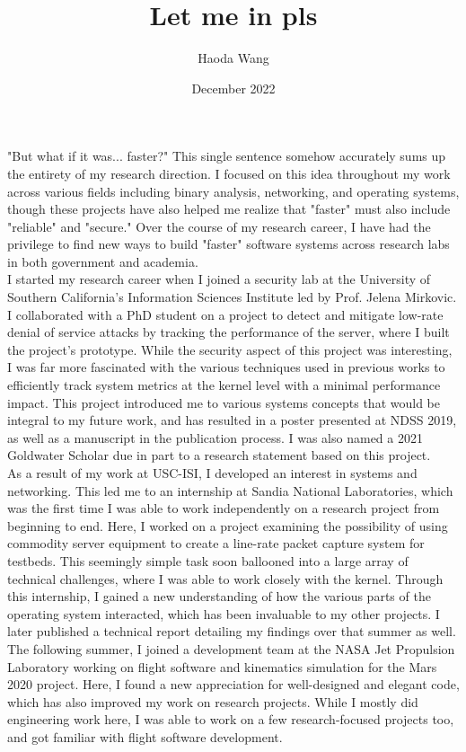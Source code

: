 \documentclass[11pt]{article}
\title{Let me in pls}
\author{Haoda Wang}
\date{December 2022}
\begin{document}
"But what if it was... faster?" This single sentence somehow accurately sums up the entirety of my research direction. I focused on this idea throughout my work across various fields including binary analysis, networking, and operating systems, though these projects have also helped me realize that "faster" must also include "reliable" and "secure." Over the course of my research career, I have had the privilege to find new ways to build "faster" software systems across research labs in both government and academia.
\\

I started my research career when I joined a security lab at the University of Southern California’s Information Sciences Institute led by Prof. Jelena Mirkovic. I collaborated with a PhD student on a project to detect and mitigate low-rate denial of service attacks by tracking the performance of the server, where I built the project’s prototype. While the security aspect of this project was interesting, I was far more fascinated with the various techniques used in previous works to efficiently track system metrics at the kernel level with a minimal performance impact. This project introduced me to various systems concepts that would be integral to my future work, and has resulted in a poster presented at NDSS 2019, as well as a manuscript in the publication process. I was also named a 2021 Goldwater Scholar due in part to a research statement based on this project.
\\

As a result of my work at USC-ISI, I developed an interest in systems and networking. This led me to an internship at Sandia National Laboratories, which was the first time I was able to work independently on a research project from beginning to end. Here, I worked on a project examining the possibility of using commodity server equipment to create a line-rate packet capture system for testbeds. This seemingly simple task soon ballooned into a large array of technical challenges, where I was able to work closely with the kernel. Through this internship, I gained a new understanding of how the various parts of the operating system interacted, which has been invaluable to my other projects. I later published a technical report detailing my findings over that summer as well.
\\

The following summer, I joined a development team at the NASA Jet Propulsion Laboratory working on flight software and kinematics simulation for the Mars 2020 project. Here, I found a new appreciation for well-designed and elegant code, which has also improved my work on research projects. While I mostly did engineering work here, I was able to work on a few research-focused projects too, and got familiar with flight software development.
\\
\end{document}
